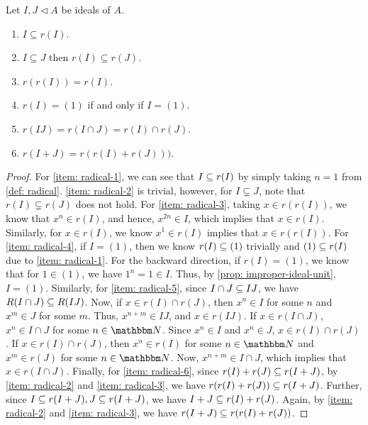 \begin{proposition}\label{prop: radical-properties}
Let $I, J \lhd A$ be ideals of $A$.
\begin{enumerate}
    \item\label{item: radical-1} $I \subseteq r(I)$.
    \item\label{item: radical-2} $I \subseteq J$ then $r(I) \subseteq r(J)$.
    \item\label{item: radical-3} $r(r(I))=r(I)$.
    \item\label{item: radical-4} $r(I)=(1)$ if and only if $I=(1)$.
    \item\label{item: radical-5} $r(I J)=r(I \cap J)=r(I) \cap r(J)$.
    \item\label{item: radical-6} $r(I+J)=r(r(I)+r(J)))$.
\end{enumerate}
\end{proposition}
\begin{proof}
    For \eqref{item: radical-1}, we can see that $I \ss r(I)$ by simply taking $n=1$ from \cref{def: radical}.  \eqref{item: radical-2} is trivial, however, for $I \subsetneq J$, note that $r(I) \subsetneq r(J)$ does not hold. For \eqref{item: radical-3}, taking $x \in r(r(I))$, we know that $x^n \in r(I)$, and hence, $x^{2n} \in I$, which implies that $x \in r(I)$. Similarly, for $x \in r(I)$, we know $x^1 \in r(I)$ implies that $x \in r(r(I))$. For \eqref{item: radical-4}, if $I = (1)$, then we know $r(I) \ss (1)$ trivially and $(1) \ss r(I)$ due to \eqref{item: radical-1}. For the backward direction, if $r(I) = (1)$, we know that for $1 \in (1)$, we have $1^n = 1 \in I$. Thus, by \cref{prop: improper-ideal-unit}, $I = (1)$. Similarly, for \eqref{item: radical-5}, since $I\cap J \ss IJ$, we have $R(I\cap J) \ss R(IJ)$. Now, if $x \in r(I) \cap r(J)$, then $x^{n} \in I$ for some $n$ and $x^{m} \in J$ for some $m$. Thus, $x^{n+m} \in IJ$, and $x \in r(IJ)$. If $x \in r(I \cap J)$, $x^n \in I\cap J$ for some $n \in \N$. Since $x^n \in I$ and $x^n \in J$, $x \in r(I) \cap r(J)$. If $x \in r(I) \cap r(J)$, then $x^n \in r(I)$ for some $n \in \N$ and $x^m\in r(J)$ for some $n \in \N$. Now, $x^{n+m} \in I\cap J$, which implies that $x \in r(I \cap J)$. Finally, for \eqref{item: radical-6}, since $r(I)+r(J) \ss r(I+J)$, by \eqref{item: radical-2} and \eqref{item: radical-3}, we have $r(r(I)+r(J)) \ss r(I+J)$. Further, since $I\ss r(I+J), J \ss r(I+J)$, we have $I+J \ss r(I)+r(J)$. Again, by \eqref{item: radical-2} and \eqref{item: radical-3}, we have $r(I+J) \ss r(r(I)+r(J))$.
\end{proof}

